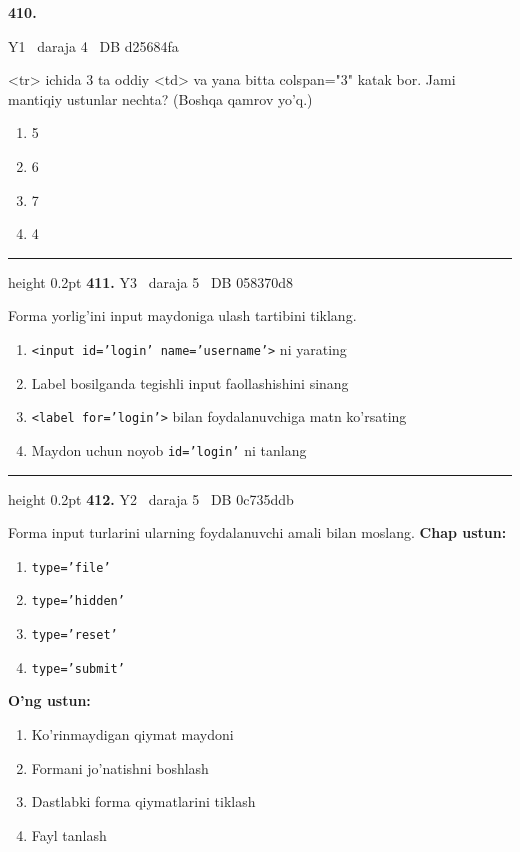 \documentclass[10pt,a4paper,oneside]{article}
\begin{document}
\hypertarget{q410}{\textbf{\color{ink}410.}}  {\color{muted}\scriptsize Y1 \textbullet\ daraja 4 \textbullet\ DB d25684fa}
\par
\textless{}tr\textgreater{} ichida 3 ta oddiy \textless{}td\textgreater{} va yana bitta colspan="3" katak bor. Jami mantiqiy ustunlar nechta? (Boshqa qamrov yo'q.)
\begin{enumerate}[label=\Alph*),leftmargin=9mm]
\item 5
\item 6
\item 7
\item 4
\end{enumerate}
\vspace{2mm}\hrule height 0.2pt \vspace{4mm}
\hypertarget{q411}{\textbf{\color{ink}411.}}  {\color{muted}\scriptsize Y3 \textbullet\ daraja 5 \textbullet\ DB 058370d8}
\par
Forma yorlig'ini input maydoniga ulash tartibini tiklang.
\begin{enumerate}[label=\Alph*),leftmargin=9mm]
\item \texttt{\textless{}input id='login' name='username'\textgreater{}} ni yarating
\item Label bosilganda tegishli input faollashishini sinang
\item \texttt{\textless{}label for='login'\textgreater{}} bilan foydalanuvchiga matn ko'rsating
\item Maydon uchun noyob \texttt{id='login'} ni tanlang
\end{enumerate}
\vspace{2mm}\hrule height 0.2pt \vspace{4mm}
\hypertarget{q412}{\textbf{\color{ink}412.}}  {\color{muted}\scriptsize Y2 \textbullet\ daraja 5 \textbullet\ DB 0c735ddb}
\par
Forma input turlarini ularning foydalanuvchi amali bilan moslang.
\textbf{\footnotesize Chap ustun:}
\begin{enumerate}[label=\arabic*),leftmargin=9mm]
\item \texttt{type='file'}
\item \texttt{type='hidden'}
\item \texttt{type='reset'}
\item \texttt{type='submit'}
\end{enumerate}
\textbf{\footnotesize O'ng ustun:}
\begin{enumerate}[label=\Alph*),leftmargin=9mm]
\item Ko'rinmaydigan qiymat maydoni
\item Formani jo'natishni boshlash
\item Dastlabki forma qiymatlarini tiklash
\item Fayl tanlash
\end{enumerate}
\end{document}
